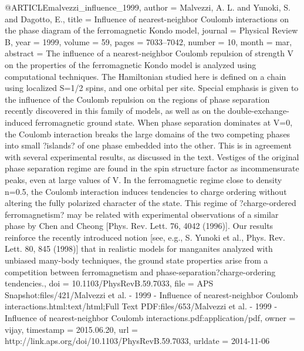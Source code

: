 @ARTICLE{malvezzi_influence_1999,
  author = {Malvezzi, A. L. and Yunoki, S. and Dagotto, E.},
  title = {Influence of nearest-neighbor {Coulomb} interactions on the phase
	diagram of the ferromagnetic {Kondo} model},
  journal = {Physical Review B},
  year = {1999},
  volume = {59},
  pages = {7033--7042},
  number = {10},
  month = mar,
  abstract = {The influence of a nearest-neighbor Coulomb repulsion of strength
	V on the properties of the ferromagnetic Kondo model is analyzed
	using computational techniques. The Hamiltonian studied here is defined
	on a chain using localized S=1/2 spins, and one orbital per site.
	Special emphasis is given to the influence of the Coulomb repulsion
	on the regions of phase separation recently discovered in this family
	of models, as well as on the double-exchange-induced ferromagnetic
	ground state. When phase separation dominates at V=0, the Coulomb
	interaction breaks the large domains of the two competing phases
	into small ?islands? of one phase embedded into the other. This is
	in agreement with several experimental results, as discussed in the
	text. Vestiges of the original phase separation regime are found
	in the spin structure factor as incommensurate peaks, even at large
	values of V. In the ferromagnetic regime close to density n=0.5,
	the Coulomb interaction induces tendencies to charge ordering without
	altering the fully polarized character of the state. This regime
	of ?charge-ordered ferromagnetism? may be related with experimental
	observations of a similar phase by Chen and Cheong [Phys. Rev. Lett.
	76, 4042 (1996)]. Our results reinforce the recently introduced notion
	[see, e.g., S. Yunoki et al., Phys. Rev. Lett. 80, 845 (1998)] that
	in realistic models for manganites analyzed with unbiased many-body
	techniques, the ground state properties arise from a competition
	between ferromagnetism and phase-separation?charge-ordering tendencies.},
  doi = {10.1103/PhysRevB.59.7033},
  file = {APS Snapshot:files/421/Malvezzi et al. - 1999 - Influence of nearest-neighbor Coulomb interactions.html:text/html;Full Text PDF:files/653/Malvezzi et al. - 1999 - Influence of nearest-neighbor Coulomb interactions.pdf:application/pdf},
  owner = {vijay},
  timestamp = {2015.06.20},
  url = {http://link.aps.org/doi/10.1103/PhysRevB.59.7033},
  urldate = {2014-11-06}
}

